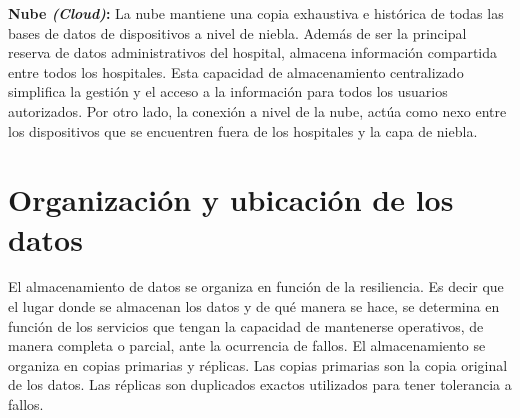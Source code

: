 \textbf{Nube \textit{(Cloud)}:} La nube mantiene una copia exhaustiva e histórica de todas las bases de datos de dispositivos a nivel de niebla. Además de ser la principal reserva de datos administrativos del hospital, almacena información compartida entre todos los hospitales. Esta capacidad de almacenamiento centralizado simplifica la gestión y el acceso a la información para todos los usuarios autorizados. Por otro lado, la conexión a nivel de la nube, actúa como nexo entre los dispositivos que se encuentren fuera de los hospitales y la capa de niebla.

\section{Organización y ubicación de los datos}
\label{sec:OrganizacionYUbicacionDatos}

El almacenamiento de datos se organiza en función de la resiliencia. Es decir que el lugar donde se almacenan los datos y de qué manera se hace, se determina en función de los servicios que tengan la capacidad de mantenerse operativos, de manera completa o parcial, ante la ocurrencia de fallos. El almacenamiento se organiza en copias primarias y réplicas. Las copias primarias son la copia original de los datos. Las réplicas son duplicados exactos utilizados para tener tolerancia a fallos.


